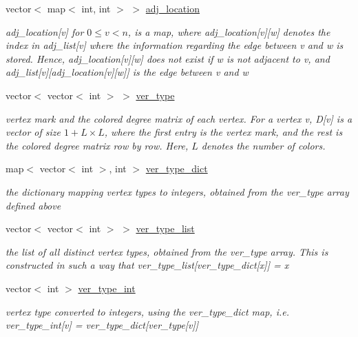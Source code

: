 \begin{DoxyCompactItemize}
vector$<$ map$<$ int, int $>$ $>$ \hyperlink{classcolored__graph_ad657e7e86bee874d19dbc1765e1edaa7}{adj\+\_\+location}
\begin{DoxyCompactList}\small\item\em adj\+\_\+location\mbox{[}v\mbox{]} for $0 \leq v < n$, is a map, where adj\+\_\+location\mbox{[}v\mbox{]}\mbox{[}w\mbox{]} denotes the index in adj\+\_\+list\mbox{[}v\mbox{]} where the information regarding the edge between v and w is stored. Hence, adj\+\_\+location\mbox{[}v\mbox{]}\mbox{[}w\mbox{]} does not exist if w is not adjacent to v, and adj\+\_\+list\mbox{[}v\mbox{]}\mbox{[}adj\+\_\+location\mbox{[}v\mbox{]}\mbox{[}w\mbox{]}\mbox{]} is the edge between v and w \end{DoxyCompactList}\item 
vector$<$ vector$<$ int $>$ $>$ \hyperlink{classcolored__graph_a2cc32e7146fa3319f83cfa940f5e1be4}{ver\+\_\+type}
\begin{DoxyCompactList}\small\item\em vertex mark and the colored degree matrix of each vertex. For a vertex v, D\mbox{[}v\mbox{]} is a vector of size $1 + L \times L$, where the first entry is the vertex mark, and the rest is the colored degree matrix row by row. Here, $L$ denotes the number of colors. \end{DoxyCompactList}\item 
map$<$ vector$<$ int $>$, int $>$ \hyperlink{classcolored__graph_aeb780762429ddac375799f4a45405712}{ver\+\_\+type\+\_\+dict}
\begin{DoxyCompactList}\small\item\em the dictionary mapping vertex types to integers, obtained from the ver\+\_\+type array defined above \end{DoxyCompactList}\item 
vector$<$ vector$<$ int $>$ $>$ \hyperlink{classcolored__graph_a3a1ae8abac458d20a2afb4aa48bbc956}{ver\+\_\+type\+\_\+list}
\begin{DoxyCompactList}\small\item\em the list of all distinct vertex types, obtained from the ver\+\_\+type array. This is constructed in such a way that ver\+\_\+type\+\_\+list\mbox{[}ver\+\_\+type\+\_\+dict\mbox{[}x\mbox{]}\mbox{]} = x \end{DoxyCompactList}\item 
vector$<$ int $>$ \hyperlink{classcolored__graph_a491ed2ea1a65118af02ec606c8d44c0a}{ver\+\_\+type\+\_\+int}
\begin{DoxyCompactList}\small\item\em vertex type converted to integers, using the ver\+\_\+type\+\_\+dict map, i.\+e. ver\+\_\+type\+\_\+int\mbox{[}v\mbox{]} = ver\+\_\+type\+\_\+dict\mbox{[}ver\+\_\+type\mbox{[}v\mbox{]}\mbox{]} \end{DoxyCompactList}\end{DoxyCompactItemize}


